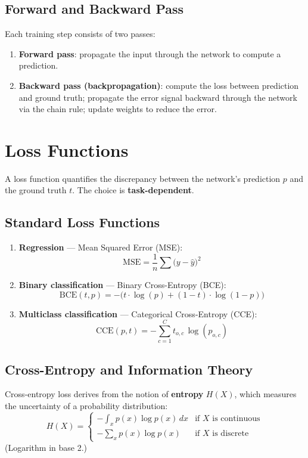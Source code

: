 \documentclass[11pt,a4paper]{article}
\theoremstyle{definition}
\theoremstyle{plain}
\theoremstyle{remark}
\begin{document}
\subsection{Forward and Backward Pass}

Each training step consists of two passes:
\begin{enumerate}
    \item \textbf{Forward pass}: propagate the input through the network to compute a prediction.
    \item \textbf{Backward pass (backpropagation)}: compute the loss between prediction and ground truth; propagate the error signal backward through the network via the chain rule; update weights to reduce the error.
\end{enumerate}


\section{Loss Functions}

A loss function quantifies the discrepancy between the network's prediction $p$ and the ground truth $t$. The choice is \textbf{task-dependent}.

\subsection{Standard Loss Functions}

\begin{enumerate}
    \item \textbf{Regression} --- Mean Squared Error (MSE):
    \[
        \mathrm{MSE} = \frac{1}{n}\sum \bigl(y - \hat{y}\bigr)^2
    \]

    \item \textbf{Binary classification} --- Binary Cross-Entropy (BCE):
    \[
        \mathrm{BCE}(t, p) = -\bigl(t \cdot \log(p) + (1-t) \cdot \log(1-p)\bigr)
    \]

    \item \textbf{Multiclass classification} --- Categorical Cross-Entropy (CCE):
    \[
        \mathrm{CCE}(p, t) = -\sum_{c=1}^{C} t_{o,c}\,\log(p_{o,c})
    \]
\end{enumerate}

\subsection{Cross-Entropy and Information Theory}

Cross-entropy loss derives from the notion of \textbf{entropy} $H(X)$, which measures the uncertainty of a probability distribution:
\[
    H(X) = \begin{cases}
        -\displaystyle\int_x p(x)\log p(x)\,dx & \text{if } X \text{ is continuous} \\[8pt]
        -\displaystyle\sum_x p(x)\log p(x)     & \text{if } X \text{ is discrete}
    \end{cases}
\]
(Logarithm in base 2.)
\end{document}
